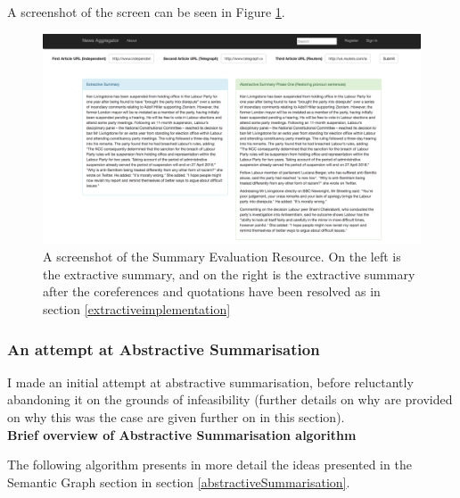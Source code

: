 \documentclass[12pt]{article}
\begin{document}
A screenshot of the screen can be seen in Figure \ref{summaryevaluationresource}.

\begin{figure}[ht!]
  \centering
    \includegraphics[scale=0.3]{SummaryEvaluationResource}
   \caption[A screenshot of the Summary Evaluation Resource]{A screenshot of the Summary Evaluation Resource. On the left is the extractive summary, and on the right is the extractive summary after the coreferences and quotations have been resolved as in section \ref{extractiveimplementation}}
   \label{summaryevaluationresource}
\end{figure} 

\subsubsection{An attempt at Abstractive Summarisation}

\label{abstractiveimplementation}

I made an initial attempt at abstractive summarisation, before reluctantly abandoning it on the grounds of infeasibility (further details on why are provided on why this was the case are given further on in this section). \\

\textbf{Brief overview of Abstractive Summarisation algorithm}

The following algorithm presents in more detail the ideas presented in the Semantic Graph section in section \ref{abstractiveSummarisation}. \\
\end{document}
